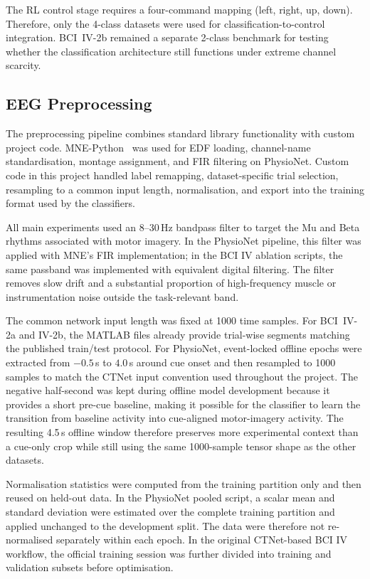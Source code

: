 \documentclass[12pt, a4paper]{article}
\begin{document}
The RL control stage requires a four-command mapping (left, right, up, down). Therefore, only the 4-class datasets were used for classification-to-control integration. BCI~IV-2b remained a separate 2-class benchmark for testing whether the classification architecture still functions under extreme channel scarcity.

\subsection{EEG Preprocessing}

The preprocessing pipeline combines standard library functionality with custom project code. MNE-Python~\cite{gramfort2013mne} was used for EDF loading, channel-name standardisation, montage assignment, and FIR filtering on PhysioNet. Custom code in this project handled label remapping, dataset-specific trial selection, resampling to a common input length, normalisation, and export into the training format used by the classifiers.

All main experiments used an 8--30\,Hz bandpass filter to target the Mu and Beta rhythms associated with motor imagery. In the PhysioNet pipeline, this filter was applied with MNE's FIR implementation; in the BCI IV ablation scripts, the same passband was implemented with equivalent digital filtering. The filter removes slow drift and a substantial proportion of high-frequency muscle or instrumentation noise outside the task-relevant band.

The common network input length was fixed at 1000 time samples. For BCI~IV-2a and IV-2b, the MATLAB files already provide trial-wise segments matching the published train/test protocol. For PhysioNet, event-locked offline epochs were extracted from $-0.5$\,s to $4.0$\,s around cue onset and then resampled to 1000 samples to match the CTNet input convention used throughout the project. The negative half-second was kept during offline model development because it provides a short pre-cue baseline, making it possible for the classifier to learn the transition from baseline activity into cue-aligned motor-imagery activity. The resulting 4.5\,s offline window therefore preserves more experimental context than a cue-only crop while still using the same 1000-sample tensor shape as the other datasets.

Normalisation statistics were computed from the training partition only and then reused on held-out data. In the PhysioNet pooled script, a scalar mean and standard deviation were estimated over the complete training partition and applied unchanged to the development split. The data were therefore not re-normalised separately within each epoch. In the original CTNet-based BCI IV workflow, the official training session was further divided into training and validation subsets before optimisation.
\end{document}
